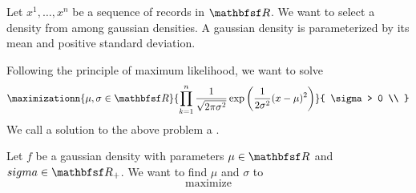 
\sbasic





































\sstart
{}



Let $x^1, \dots, x^n$ be a sequence
of records in $\R$.
We want to select a density from
among gaussian densities.
A gaussian density is parameterized
by its mean and positive standard deviation.

Following the principle of maximum likelihood,
we want to solve
\[
  \maximizationn{\mu,\sigma \in \R}{
    \prod_{k = 1}^{n}  \frac{1}{\sqrt{2\pi\sigma^2}} \exp \left(\frac{1}{2\sigma^2} (x - \mu)^2 \right)
  }{
    \sigma > 0 \\
  }
\]
We call a solution to the above problem
a .

Let $f$ be a gaussian density with
parameters $\mu \in \R$ and $sigma \in \R_+$.
We want to find $\mu$ and $\sigma$ to
\[
  \text{maximize}
\]


